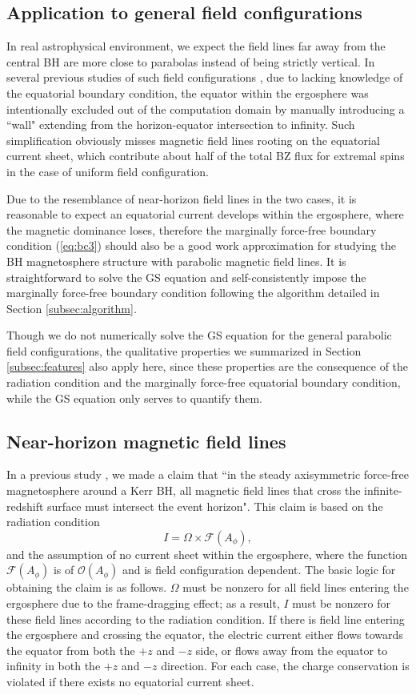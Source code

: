 \documentclass[aps,prd,reprint,nofootinbib, superscriptaddress]{revtex4-1}
\def\Ap{A_\phi}
\def\be{\begin{equation}}
\def\ee{\end{equation}}
\begin{document}
\subsection{Application to general field configurations}
In real astrophysical environment, we expect the field lines far away from the central BH
are more close to parabolas instead of being strictly vertical. In several previous studies of such field
configurations \cite[e.g.][]{Tchekhovskoy2010,Nathanail2014,Mahlmann2018},
due to lacking knowledge of the equatorial boundary condition, the
equator within the ergosphere was intentionally excluded out of the computation domain by manually
introducing a ``wall" extending from the horizon-equator intersection to infinity. Such
simplification obviously misses magnetic field lines rooting on the
equatorial current sheet, which contribute about half of the total BZ flux for extremal spins in
the case of uniform field configuration.

Due to the resemblance of near-horizon field lines in the two cases,
it is reasonable to expect an equatorial current develops within the ergosphere,
where the magnetic dominance loses, therefore the marginally force-free boundary
condition (\ref{eq:bc3}) should also be a good work approximation for studying
the BH magnetosphere structure with parabolic magnetic field lines.
It is straightforward to solve the GS equation and self-consistently
impose the marginally force-free boundary condition following the
algorithm detailed in Section \ref{subsec:algorithm}.

Though we do not numerically solve the GS equation for the general parabolic field configurations,
the qualitative properties we summarized in Section \ref{subsec:features} also apply here,
since these properties are the consequence of the radiation condition and the marginally force-free equatorial boundary condition,
while the GS equation only serves to quantify them.



\subsection{Near-horizon magnetic field lines}
In a previous study \cite{Pan2016a}, we made a claim that ``in the steady axisymmetric force-free magnetosphere
around a Kerr BH, all magnetic field lines that cross the infinite-redshift surface must intersect the event horizon".
This claim is based on the radiation condition
\be
\label{eq:Grad}
I = \Omega \times \mathcal F(\Ap),
\ee
and the assumption of no current sheet within the ergosphere,
where the function $\mathcal F(\Ap)$ is of $\mathcal O(\Ap)$ and  is field configuration dependent.
The basic logic for obtaining the claim is as follows.
$\Omega$ must be nonzero for all field lines entering the ergosphere due to the frame-dragging effect;
as a result, $I$ must be nonzero for these field lines according to the radiation condition.
If there is field line entering the ergosphere and crossing the equator, the electric current either flows
towards the equator from both the $+z$ and $-z$ side, or flows away from the equator to infinity in
both the $+z$ and $-z$ direction. For each case, the charge conservation is violated
if there exists no equatorial current sheet.
\end{document}

